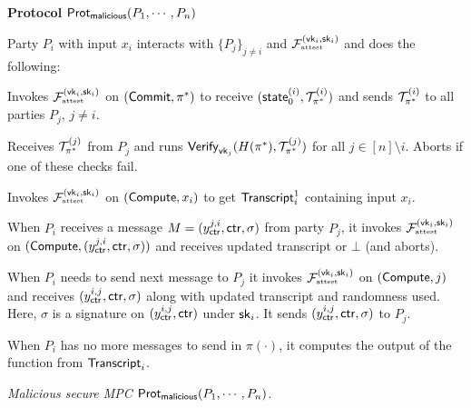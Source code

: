 

\begin{tffbox}
\begin{mdframed}
\begin{center}
{\bf Protocol} $\mathsf{Prot}_{\tiny{\mathsf{malicious}}}(P_1,\cdots,P_n)$
\end{center}
{\small

Party $P_i$ with input $x_i$ interacts with $\{P_j\}_{j\ne i}$ and $\mathcal{F}_{\textrm{\tiny{attest}}}^{(\mathsf{vk}_i,\mathsf{sk}_i)}$ and does the following:
\begin{tiret}
\item Invokes $\mathcal{F}_{\textrm{\tiny{attest}}}^{(\mathsf{vk}_i,\mathsf{sk}_i)}$ on $(\mathsf{Commit},\pi^*)$ to receive $( \mathsf{state}^{(i)}_0, \mathcal{T}^{(i)}_{\pi^*})$ and sends $\mathcal{T}^{(i)}_{\pi^*}$ to all parties $P_j$, $j \ne i$.

\item Receives $\mathcal{T}^{(j)}_{\pi^*}$ from $P_j$ and runs $\mathsf{Verify}_{\mathsf{vk}_j}(H(\pi^*), \mathcal{T}^{(j)}_{\pi^*} )$ for all $j \in [n]\setminus i$. Aborts if one of these checks fail.

\item Invokes $\mathcal{F}_{\textrm{\tiny{attest}}}^{(\mathsf{vk}_i,\mathsf{sk}_i)}$ on $(\mathsf{Compute}, x_i)$ to get $\mathsf{Transcript}_i^1$ containing input $x_i$. %

\item When $P_i$ receives a message $M = (y_{\mathsf{ctr}}^{j,i},\mathsf{ctr},\sigma)$ from party $P_j$, it invokes $\mathcal{F}_{\textrm{\tiny{attest}}}^{(\mathsf{vk}_i,\mathsf{sk}_i)}$ on  $( \mathsf{Compute}, (y_{\mathsf{ctr}}^{j,i},\mathsf{ctr},\sigma))$ and receives updated transcript or $\bot$ (and aborts).

\item When $P_i$ needs to send next message to $P_j$ it invokes $\mathcal{F}_{\textrm{\tiny{attest}}}^{(\mathsf{vk}_i,\mathsf{sk}_i)}$ on $( \mathsf{Compute}, j)$ and receives $(y_{\mathsf{ctr}}^{i,j},\mathsf{ctr}, \sigma)$ along with updated transcript and randomness used. Here, $\sigma$ is a signature on $(y_{\mathsf{ctr}}^{i,j},\mathsf{ctr})$ under $\mathsf{sk}_i$. It sends $(y_{\mathsf{ctr}}^{i,j},\mathsf{ctr}, \sigma)$ to $P_j$.
   
   \item When $P_i$ has no more messages to send in $\pi(\cdot)$, it computes the output of the function from 
$\mathsf{Transcript}_i$.
	       			
\end{tiret}
} %
\end{mdframed}
\caption{\sl Malicious secure MPC $\mathsf{Prot}_{\tiny{\mathsf{malicious}}}(P_1,\cdots,P_n)$.}
\label{fig:shtomprotocol}
\end{tffbox}


